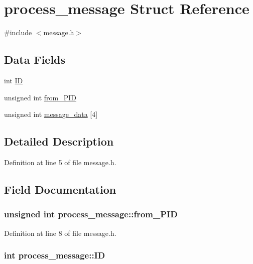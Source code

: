 \hypertarget{structprocess__message}{
\section{process\_\-message Struct Reference}
\label{structprocess__message}
}


{\ttfamily \#include $<$message.h$>$}

\subsection*{Data Fields}
\begin{DoxyCompactItemize}
\item 
int \hyperlink{structprocess__message_a7832bc5e18d144859ea562b78df5eb27}{ID}
\item 
unsigned int \hyperlink{structprocess__message_a7f3ca65a936db37ec093c1fa35a4306c}{from\_\-PID}
\item 
unsigned int \hyperlink{structprocess__message_ae605af7258e98fe38daeefccda5ea30b}{message\_\-data} \mbox{[}4\mbox{]}
\end{DoxyCompactItemize}


\subsection{Detailed Description}


Definition at line 5 of file message.h.



\subsection{Field Documentation}
\hypertarget{structprocess__message_a7f3ca65a936db37ec093c1fa35a4306c}{
\subsubsection[{from\_\-PID}]{\setlength{\rightskip}{0pt plus 5cm}unsigned int {\bf process\_\-message::from\_\-PID}}}
\label{structprocess__message_a7f3ca65a936db37ec093c1fa35a4306c}


Definition at line 8 of file message.h.

\hypertarget{structprocess__message_a7832bc5e18d144859ea562b78df5eb27}{
\subsubsection[{ID}]{\setlength{\rightskip}{0pt plus 5cm}int {\bf process\_\-message::ID}}}
\label{structprocess__message_a7832bc5e18d144859ea562b78df5eb27}


